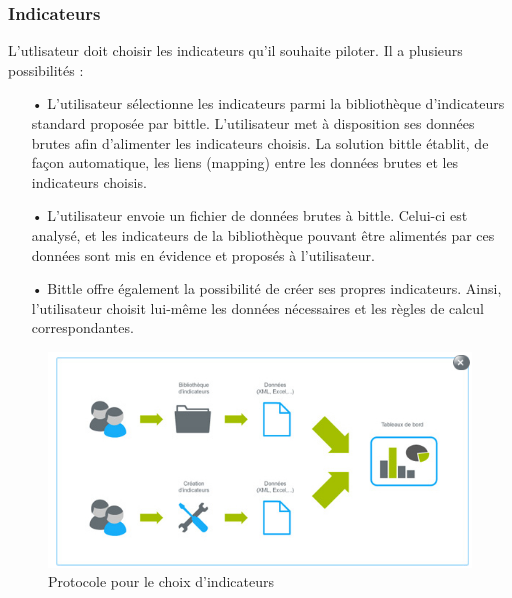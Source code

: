 \subsubsection{Indicateurs}
L'utlisateur doit choisir les indicateurs qu'il souhaite piloter. Il a plusieurs possibilités :
\begin{itemize}
\item[•]L’utilisateur sélectionne les indicateurs parmi la bibliothèque d’indicateurs standard proposée par bittle. L’utilisateur met à disposition ses données brutes afin d’alimenter les indicateurs choisis. La solution bittle établit, de façon automatique, les liens (mapping) entre les données brutes et les indicateurs choisis.
\item[•]L’utilisateur envoie un fichier de données brutes à bittle. Celui-ci est analysé, et les indicateurs de la bibliothèque pouvant être alimentés par ces données sont mis en évidence et proposés à l’utilisateur.
\item[•]Bittle offre également la possibilité de créer ses propres indicateurs. Ainsi, l’utilisateur choisit lui-même les données nécessaires et les règles de calcul correspondantes. 
\end{itemize} 

\begin{figure}[H]
\begin{center}
  \includegraphics[scale= 0.6]{indicateur.png}
  \caption{Protocole pour le choix d'indicateurs}
\end{center}  
\end{figure}

